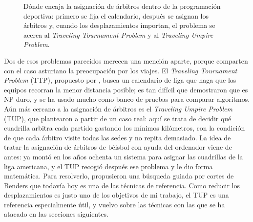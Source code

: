 \documentclass[11pt,a4paper,spanish]{book}
\numberwithin{equation}{chapter}
\numberwithin{figure}{chapter}
\numberwithin{table}{chapter}
\newcommand{\fuente}[1]{\par\vspace{2pt}{\footnotesize\textit{Fuente: #1}}}
\begin{document}
\begin{figure}[ht]
\centering
{}
\caption{Dónde encaja la asignación de árbitros dentro de la programación deportiva: primero se fija el calendario, después se asignan los árbitros y, cuando los desplazamientos importan, el problema se acerca al \emph{Traveling Tournament Problem} y al \emph{Traveling Umpire Problem}.}
\label{fig:familia}
\fuente{elaboración propia.}
\end{figure}

Dos de esos problemas parecidos merecen una mención aparte, porque comparten con el caso asturiano la preocupación por los viajes. El \emph{Traveling Tournament Problem} (TTP), propuesto por , busca un calendario de liga que haga que los equipos recorran la menor distancia posible; es tan difícil que  demostraron que es NP-duro, y se ha usado mucho como banco de pruebas para comparar algoritmos. Aún más cercano a la asignación de árbitros es el \emph{Traveling Umpire Problem} (TUP), que plantearon  a partir de un caso real: aquí se trata de decidir qué cuadrilla arbitra cada partido gastando los mínimos kilómetros, con la condición de que cada árbitro visite todas las sedes y no repita demasiado. La idea de tratar la asignación de árbitros de béisbol con ayuda del ordenador viene de antes: ya  montó en los años ochenta un sistema para asignar las cuadrillas de la liga americana, y el TUP recogió después ese problema y le dio forma matemática. Para resolverlo,  propusieron una búsqueda guiada por cortes de Benders que todavía hoy es una de las técnicas de referencia. Como reducir los desplazamientos es justo uno de los objetivos de mi trabajo, el TUP es una referencia especialmente útil, y vuelvo sobre las técnicas con las que se ha atacado en las secciones siguientes.
\end{document}
